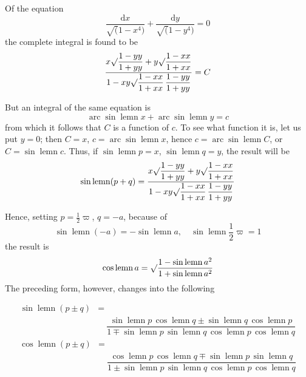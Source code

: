 Of the equation
\[
\dfrac{\mathrm{d}x}{\surd(1-x^4)}+\dfrac{\mathrm{d}y}{\surd(1-y^4)}=0
\]
the complete integral is found to be
\[
\dfrac{x\surd\dfrac{1-yy}{1+yy}+y\surd\dfrac{1-xx}{1+xx}}
{1-xy\surd\dfrac{1-xx}{1+xx}\,\dfrac{1-yy}{1+yy}}=C
\]

But an integral of the same equation is
\[
\operatorname{arc}\sin\operatorname{lemn}x+\operatorname{arc}\sin\operatorname{lemn}y=c
\]
from which it follows that $C$ is a function of $c$. To see what function it is, let us put $y=0$; then $C=x$, $c=\operatorname{arc}\sin\operatorname{lemn}x$, hence $c=\operatorname{arc}\sin\operatorname{lemn}C$, or $C=\sin\operatorname{lemn}c$. Thus, if $\sin\operatorname{lemn}p=x$, $\sin\operatorname{lemn}q=y$, the result will be
\[
\sin\operatorname{lemn}(p+q)=
\dfrac{x\surd\dfrac{1-yy}{1+yy}+y\surd\dfrac{1-xx}{1+xx}}
{1-xy\surd\dfrac{1-xx}{1+xx}\,\dfrac{1-yy}{1+yy}}
\]

Hence, setting $p=\tfrac12\varpi$, $q=-a$, because of
\[
\sin\operatorname{lemn}(-a)=-\sin\operatorname{lemn}a,\quad
\sin\operatorname{lemn}\dfrac12\varpi=1
\]
the result is
\[
\cos\operatorname{lemn}a=\surd\dfrac{1-\sin\operatorname{lemn}a^2}{1+\sin\operatorname{lemn}a^2}
\]
The preceding form, however, changes into the following


\[
\begin{aligned}\sin\operatorname{lemn}(p\pm q)&=\\[7pt]&\quad{}
\dfrac{\sin\operatorname{lemn}p\,\cos\operatorname{lemn}q\pm\sin\operatorname{lemn}q\,\cos\operatorname{lemn}p}
{1\mp\sin\operatorname{lemn}p\,\sin\operatorname{lemn}q\,\cos\operatorname{lemn}p\,\cos\operatorname{lemn}q}\end{aligned}
\]
\[
\begin{aligned}\cos\operatorname{lemn}(p\pm q)&=\\[7pt]&\quad{}
\dfrac{\cos\operatorname{lemn}p\,\cos\operatorname{lemn}q\mp\sin\operatorname{lemn}p\,\sin\operatorname{lemn}q}
{1\pm\sin\operatorname{lemn}p\,\sin\operatorname{lemn}q\,\cos\operatorname{lemn}p\,\cos\operatorname{lemn}q}\end{aligned}
\]


